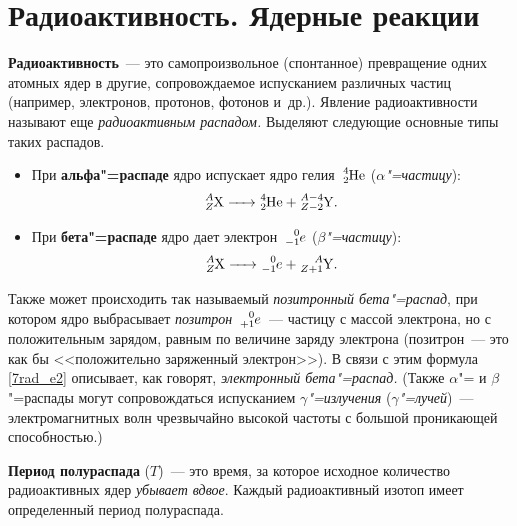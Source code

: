 \documentclass[main.tex]{subfiles}
\begin{document}

 

 

 
   

\section{Радиоактивность. Ядерные реакции}


\textbf{Радиоактивность}~--- это самопроизвольное (спонтанное) превращение одних атомных ядер в другие, сопровождаемое испусканием различных частиц (например, электронов, протонов, фотонов и~др.). 
Явление радиоактивности называют еще \emph{радиоактивным распадом.} Выделяют следующие основные типы таких распадов.
\begin{itemize}
    \item При \textbf{альфа"=распаде} ядро испускает ядро гелия~$\ce{^4_2He}$ (\emph{$\alpha$"=частицу}):
    \begin{equation}
        \label{7rad_e1}
        \ce{^$A$_$Z$X -> ^4_2He + ^{$A$-4}_{$Z$-2}Y}.
    \end{equation}
    \item При \textbf{бета"=распаде} ядро дает электрон~$\ce{^0_{-1}$e$}$ (\emph{$\beta$"=частицу}): 
    \begin{equation}
        \label{7rad_e2}
        \ce{^$A$_$Z$X -> ^0_{-1}$e$ + ^{$A$}_{$Z$+1}Y}.
    \end{equation}

\end{itemize}

Также может происходить так называемый \emph{позитронный бета"=распад}, при котором ядро выбрасывает \emph{позитрон}~$\ce{^0_{+1}$e$}$~--- частицу с массой электрона, но с положительным зарядом, равным по величине заряду электрона (позитрон~--- это как бы <<положительно заряженный электрон>>). В связи с этим формула \eqref{7rad_e2} описывает, как говорят, \emph{электронный бета"=распад.} (Также $\alpha$"= и $\beta$"=распады могут сопровождаться испусканием \emph{$\gamma$"=излучения} (\emph{$\gamma$"=лучей})~--- электромагнитных волн чрезвычайно высокой частоты с большой проникающей способностью.)

\textbf{Период полураспада} ($T$)~--- это время, за которое исходное количество радиоактивных ядер \emph{убывает вдвое}. Каждый радиоактивный изотоп имеет определенный период полураспада. 
\end{document}
